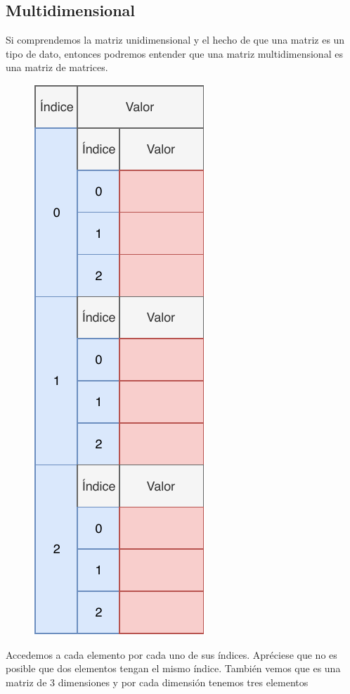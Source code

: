 \documentclass[11pt, oneside]{book}		%
\begin{document}
		\subsection{Multidimensional}
		Si comprendemos la matriz unidimensional y el hecho de que una matriz es un tipo de dato, entonces podremos entender que una matriz multidimensional\cite{msdn:matrizmultidimensional} es una matriz de matrices.
		\begin{figure}[H]
			\centering
			\includegraphics{img/TiposEnumerables/Matriz/array3.pdf}
		\end{figure} 
		Accedemos a cada elemento por cada uno de sus índices. Apréciese que no es posible que dos elementos tengan el mismo índice. También vemos que es una matriz de 3 dimensiones y por cada dimensión tenemos tres elementos\\
\end{document}
